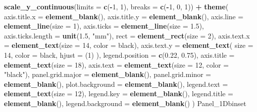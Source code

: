 \documentclass[
]{krantz}
\makeatletter
\newenvironment{Shaded}{\begin{snugshade}}{\end{snugshade}}
\newcommand{\DataTypeTok}[1]{\textcolor[rgb]{0.13,0.29,0.53}{#1}}
\newcommand{\DecValTok}[1]{\textcolor[rgb]{0.00,0.00,0.81}{#1}}
\newcommand{\FloatTok}[1]{\textcolor[rgb]{0.00,0.00,0.81}{#1}}
\newcommand{\KeywordTok}[1]{\textcolor[rgb]{0.13,0.29,0.53}{\textbf{#1}}}
\newcommand{\NormalTok}[1]{#1}
\newcommand{\OperatorTok}[1]{\textcolor[rgb]{0.81,0.36,0.00}{\textbf{#1}}}
\newcommand{\StringTok}[1]{\textcolor[rgb]{0.31,0.60,0.02}{#1}}
\newenvironment{kframe}{%
\medskip{}
\setlength{\fboxsep}{.8em}
 \def\at@end@of@kframe{}%
 \ifinner\ifhmode%
  \def\at@end@of@kframe{\end{minipage}}%
  \begin{minipage}{\columnwidth}%
 \fi\fi%
 \def\FrameCommand##1{\hskip\@totalleftmargin \hskip-\fboxsep
 \colorbox{shadecolor}{##1}\hskip-\fboxsep
     \hskip-\linewidth \hskip-\@totalleftmargin \hskip\columnwidth}%
 \MakeFramed {\advance\hsize-\width
   \@totalleftmargin\z@ \linewidth\hsize
   \@setminipage}}%
 {\par\unskip\endMakeFramed%
 \at@end@of@kframe}
\renewenvironment{Shaded}{\begin{kframe}}{\end{kframe}}
\makeatother
\begin{document}
\begin{Shaded}
\begin{Highlighting}[]
\StringTok{  }\KeywordTok{scale\_y\_continuous}\NormalTok{(}\DataTypeTok{limits =} \KeywordTok{c}\NormalTok{(}\OperatorTok{{-}}\DecValTok{1}\NormalTok{, }\DecValTok{1}\NormalTok{), }\DataTypeTok{breaks =} \KeywordTok{c}\NormalTok{(}\OperatorTok{{-}}\DecValTok{1}\NormalTok{, }\DecValTok{0}\NormalTok{, }\DecValTok{1}\NormalTok{)) }\OperatorTok{+}
\StringTok{  }\KeywordTok{theme}\NormalTok{(}
    \DataTypeTok{axis.title.x =} \KeywordTok{element\_blank}\NormalTok{(),}
    \DataTypeTok{axis.title.y =} \KeywordTok{element\_blank}\NormalTok{(),}
    \DataTypeTok{axis.line =} \KeywordTok{element\_line}\NormalTok{(}\DataTypeTok{size =} \DecValTok{1}\NormalTok{),}
    \DataTypeTok{axis.ticks =} \KeywordTok{element\_line}\NormalTok{(}\DataTypeTok{size =} \FloatTok{1.5}\NormalTok{),}
    \DataTypeTok{axis.ticks.length =} \KeywordTok{unit}\NormalTok{(}\FloatTok{1.5}\NormalTok{, }\StringTok{"mm"}\NormalTok{),}
    \DataTypeTok{rect =} \KeywordTok{element\_rect}\NormalTok{(}\DataTypeTok{size =} \DecValTok{2}\NormalTok{),}
    \DataTypeTok{axis.text.x =} \KeywordTok{element\_text}\NormalTok{(}\DataTypeTok{size =} \DecValTok{14}\NormalTok{, }\DataTypeTok{color =} \StringTok{\textquotesingle{}black\textquotesingle{}}\NormalTok{),}
    \DataTypeTok{axis.text.y =}
      \KeywordTok{element\_text}\NormalTok{(}
        \DataTypeTok{size =} \DecValTok{14}\NormalTok{,}
        \DataTypeTok{color =} \StringTok{\textquotesingle{}black\textquotesingle{}}\NormalTok{,}
        \DataTypeTok{hjust =}\NormalTok{ (}\DecValTok{1}\NormalTok{)}
\NormalTok{      ),}
    \DataTypeTok{legend.position =} \KeywordTok{c}\NormalTok{(}\FloatTok{0.22}\NormalTok{, }\FloatTok{0.75}\NormalTok{),}
    \DataTypeTok{axis.title =} \KeywordTok{element\_text}\NormalTok{(}\DataTypeTok{size =} \DecValTok{18}\NormalTok{),}
    \DataTypeTok{axis.text =} \KeywordTok{element\_text}\NormalTok{(}\DataTypeTok{size =} \DecValTok{12}\NormalTok{, }\DataTypeTok{color =} \StringTok{"black"}\NormalTok{),}
    \DataTypeTok{panel.grid.major =} \KeywordTok{element\_blank}\NormalTok{(),}
    \DataTypeTok{panel.grid.minor =} \KeywordTok{element\_blank}\NormalTok{(),}
    \DataTypeTok{plot.background =} \KeywordTok{element\_blank}\NormalTok{(),}
    \DataTypeTok{legend.text =} \KeywordTok{element\_text}\NormalTok{(}\DataTypeTok{size =} \DecValTok{12}\NormalTok{),}
    \DataTypeTok{legend.key =} \KeywordTok{element\_blank}\NormalTok{(),}
    \DataTypeTok{legend.title =} \KeywordTok{element\_blank}\NormalTok{(),}
    \DataTypeTok{legend.background =} \KeywordTok{element\_blank}\NormalTok{()}
\NormalTok{  )}
\NormalTok{Panel\_1Dbinset}
\end{Highlighting}
\end{Shaded}
\end{document}
